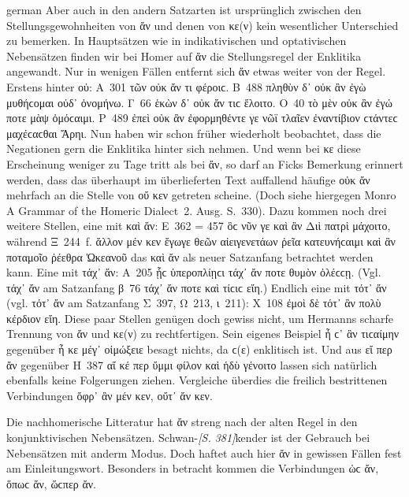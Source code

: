 \begin{otherlanguage*}{german}
\largerpage
Aber auch in den andern Satzarten ist ursprünglich zwischen den Stellungsgewohnheiten von ἄν und denen von κε(ν) kein wesentlicher Unterschied zu bemerken. In Hauptsätzen wie in indikativischen und optativischen Nebensätzen finden wir bei Homer auf ἄν die Stellungsregel der Enklitika angewandt. Nur in wenigen Fällen entfernt sich ἄν etwas weiter von der Regel. Erstens hinter οὐ: Α~301 τῶν οὐκ ἄν τι φέροιϲ. Β~488 πληθὺν δ᾽ οὐκ ἂν ἐγὼ μυθήϲομαι οὐδ᾽ ὀνομήνω. Γ~66 ἑκὼν δ᾽ οὐκ ἄν τιϲ ἕλοιτο. Ο~40 τὸ μὲν οὐκ ἂν ἐγώ ποτε μὰψ ὀμόϲαιμι. Ρ~489 ἐπεὶ οὐκ ἂν ἐφορμηθέντε γε νῶϊ τλαῖεν ἐναντίβιον ϲτάντεϲ μαχέϲαϲθαι Ἄρηι. Nun haben wir schon früher wiederholt beobachtet, dass die Negationen gern die Enklitika hinter sich nehmen. Und wenn bei κε diese Erscheinung weniger zu Tage tritt als bei ἄν, so darf an Ficks Bemerkung erinnert werden, dass das überhaupt im überlieferten Text auffallend häufige οὐκ ἄν mehrfach an die Stelle von οὔ κεν getreten scheine. (Doch siehe hiergegen Monro A Grammar of the Homeric Dialect~2. Ausg. S.~330). Dazu kommen noch drei weitere Stellen, eine mit καὶ ἄν: Ε~362 = 457 ὃϲ νῦν γε καὶ ἂν Διὶ πατρὶ μάχοιτο, während Ξ~244~f. ἄλλον μέν κεν ἔγωγε θεῶν αἰειγενετάων ῥεῖα κατευνήϲαιμι καὶ ἂν ποταμοῖο ῥέεθρα Ὠκεανοῦ das καὶ ἄν als neuer Satzanfang betrachtet werden kann. Eine mit τάχ᾽ ἄν: Α~205 ᾗϲ ὑπεροπλίῃϲι τάχ᾽ ἄν ποτε θυμὸν ὀλέϲϲῃ. (Vgl. τάχ᾽ ἄν am Satzanfang β~76 τάχ᾽ ἄν ποτε καὶ τίϲιϲ εἴη.) Endlich eine mit τότ᾽ ἄν (vgl. τότ᾽ ἄν am Satzanfang Σ~397, Ω~213, ι~211): Χ~108 ἐμοὶ δὲ τότ᾽ ἂν πολὺ κέρδιον εἴη. Diese paar Stellen genügen doch gewiss nicht, um Hermanns scharfe Trennung von ἄν und κε(ν) zu rechtfertigen. Sein eigenes Beispiel ἦ ϲ᾽ ἂν τιϲαίμην gegenüber ἦ κε μέγ᾽ οἰμώξειε besagt nichts, da ϲ(ε) enklitisch ist. Und aus εἴ περ ἄν gegenüber Η~387 αἴ κέ περ ὔμμι φίλον καὶ ἡδὺ γένοιτο lassen sich natürlich ebenfalls keine Folgerungen ziehen. Vergleiche überdies die freilich bestrittenen Verbindungen ὄφρ᾽ ἂν μέν κεν, οὔτ᾽ ἄν κεν.

Die nachhomerische Litteratur hat ἄν streng nach der alten Regel in den konjunktivischen Nebensätzen. Schwan-\hypertarget{p381}{\emph{[S. 381]}}\label{p381}kender ist der Gebrauch bei Nebensätzen mit anderm Modus. Doch haftet auch hier ἄν in gewissen Fällen fest am Einleitungswort. Besonders in betracht kommen die Verbindungen ὡϲ ἄν, ὅπωϲ ἄν, ὥϲπερ ἄν.


\end{otherlanguage*}
